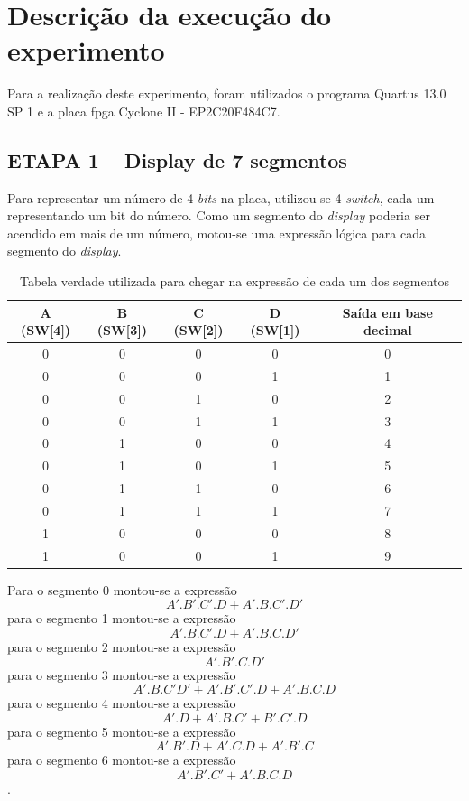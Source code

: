 
\chapter{Descrição da execução do experimento}

	Para a realização deste experimento, foram utilizados o programa Quartus 13.0 SP 1 e a placa \ac{fpga}
Cyclone II - EP2C20F484C7.

	\section{ETAPA 1 – Display de 7 segmentos}
		Para representar um número de 4 \textit{bits} na placa, utilizou-se 4 \textit{switch}, cada um
		representando um bit do número. Como um segmento do \textit{display} poderia ser acendido
		em mais de um número,
		motou-se uma expressão lógica para cada segmento do \textit{display}.

		\begin{table}[h]
			\centering
			\caption{Tabela verdade utilizada para chegar na expressão de cada um dos segmentos}
			\label{table:tabelaVerdade1}
			\begin{tabular}{c|c|c|c|c}
				\textbf{A (SW[4])} & \textbf{B (SW[3])} & \textbf{C (SW[2])} & \textbf{D (SW[1])} & \textbf{Saída em base decimal} \\
				\hline
				0 & 0 & 0 & 0 & 0\\
				0 & 0 & 0 & 1 & 1\\
				0 & 0 & 1 & 0 & 2\\
				0 & 0 & 1 & 1 & 3\\
				0 & 1 & 0 & 0 & 4\\
				0 & 1 & 0 & 1 & 5\\
				0 & 1 & 1 & 0 & 6\\
				0 & 1 & 1 & 1 & 7\\
				1 & 0 & 0 & 0 & 8\\
				1 & 0 & 0 & 1 & 9\\
			\end{tabular}
		\end{table}

		Para o segmento 0 montou-se a expressão
		$$A'.B'.C'.D+A'.B.C'.D'$$
		para o segmento 1 montou-se a expressão
		$$A'.B.C'.D+A'.B.C.D'$$
		para o segmento 2 montou-se a expressão
		$$A'.B'.C.D'$$
		para o segmento 3 montou-se a expressão
		$$A'.B.C'D'+A'.B'.C'.D+A'.B.C.D$$
		para o segmento 4 montou-se a expressão
		$$A'.D+A'.B.C'+B'.C'.D$$
		para o segmento 5 montou-se a expressão
		$$A'.B'.D+A'.C.D+A'.B'.C$$
		para o segmento 6 montou-se a expressão
		$$A'.B'.C'+A'.B.C.D$$.

